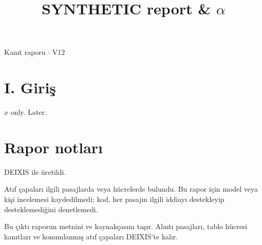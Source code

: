 \documentclass[journal]{IEEEtran}
\begin{document}
\renewcommand{\abstractname}{Özet}
\renewcommand{\IEEEkeywordsname}{Dizin Terimleri}
\renewcommand{\refname}{Kaynaklar}

\title{SYNTHETIC report \& \ensuremath{\alpha}}

\maketitle

\noindent Kanıt raporu \ensuremath{\cdot} V12

\section*{I. Giriş}

$x$ only. \cite{Synth26} Later. \cite{Synth26}

\section*{Rapor notları}

DEIXIS ile üretildi.

Atıf çapaları ilgili pasajlarda veya hücrelerde bulundu. Bu rapor için model veya kişi incelemesi kaydedilmedi; kod, her pasajın ilgili iddiayı destekleyip desteklemediğini denetlemedi.

Bu çıktı raporun metnini ve kaynakçasını taşır. Alıntı pasajları, tablo hücresi kanıtları ve konumlanmış atıf çapaları DEIXIS'te kalır.




\end{document}
